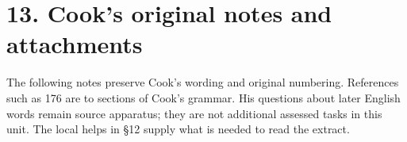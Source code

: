 \section*{13. Cook’s original notes and attachments}

\begingroup\fontsize{10}{12.8}\selectfont
\setlength{\parskip}{1.5pt}
The following notes preserve Cook’s wording and original numbering. References such as 176 are to sections of Cook’s grammar. His questions about later English words remain source apparatus; they are not additional assessed tasks in this unit. The local helps in §12 supply what is needed to read the extract.

\par\begingroup
\fontsize{10.5}{13.2}\selectfont
\setlength{\LTleft}{0pt}\setlength{\LTright}{\fill}
